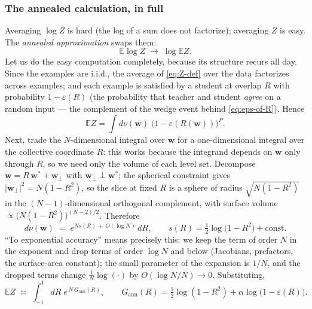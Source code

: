 \documentclass[11pt]{article}
\newcommand{\E}{\mathbb{E}}
\newcommand{\bv}[1]{\boldsymbol{#1}}
\begin{document}
\subsubsection{The annealed calculation, in full}
\label{sec:annealed}

Averaging $\log Z$ is hard (the log of a sum does not factorize); averaging
$Z$ is easy. The \emph{annealed approximation} swaps them:
\begin{equation}
  \label{eq:annealed-swap}
  \E \log Z \;\longrightarrow\; \log \E Z .
\end{equation}
Let us do the easy computation completely, because its structure recurs all
day. Since the examples are i.i.d., the average of \cref{eq:Z-def} over the
data factorizes across examples; and each example is satisfied by a student
at overlap $R$ with probability $1 - \varepsilon(R)$ (the probability that
teacher and student \emph{agree} on a random input --- the complement of the
wedge event behind \cref{eq:eps-of-R}). Hence
\begin{equation}
  \label{eq:EZ}
  \E Z = \int d\nu(\bv{w})\; \bigl(1 - \varepsilon(R(\bv{w}))\bigr)^{P}.
\end{equation}
Next, trade the $N$-dimensional integral over $\bv{w}$ for a
one-dimensional integral over the collective coordinate $R$: this works
because the integrand depends on $\bv{w}$ only through $R$, so we need only
the volume of each level set. Decompose $\bv{w} = R\,\bv{w}^* +
\bv{w}_\perp$ with $\bv{w}_\perp \perp \bv{w}^*$; the spherical constraint
gives $|\bv{w}_\perp|^2 = N(1 - R^2)$, so the slice at fixed $R$ is a
sphere of radius $\sqrt{N(1-R^2)}$ in the $(N-1)$-dimensional orthogonal
complement, with surface volume $\propto \bigl(N(1-R^2)\bigr)^{(N-2)/2}$.
Therefore
\begin{equation}
  \label{eq:coarea}
  d\nu(\bv{w}) \;=\; e^{N s(R)\, +\, O(\log N)}\,dR,
  \qquad
  s(R) = \tfrac12 \log\bigl(1 - R^2\bigr) + \text{const}.
\end{equation}
``To exponential accuracy'' means precisely this: we keep the term of order
$N$ in the exponent and drop terms of order $\log N$ and below (Jacobians,
prefactors, the surface-area constant); the small parameter of the
expansion is $1/N$, and the dropped terms change $\frac1N \log(\cdot)$ by
$O(\log N / N) \to 0$. Substituting,
\begin{equation}
  \label{eq:annealed-integral}
  \E Z \;\asymp\; \int_{-1}^{1} dR\;
  e^{\,N\,G_{\mathrm{ann}}(R)},
  \qquad
  G_{\mathrm{ann}}(R) = \tfrac12\log(1-R^2)
  + \alpha \log\bigl(1 - \varepsilon(R)\bigr).
\end{equation}
\end{document}
